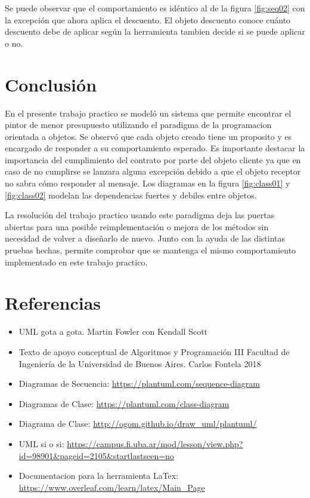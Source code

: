 \documentclass[titlepage,a4paper]{article}
\begin{document}
  Se puede observar que el comportamiento es idéntico al de la figura \ref{fig:seq02} 
  con la excepción que ahora aplica el descuento. El objeto descuento conoce cuánto descuento debe de aplicar según la herramienta 
  tambien decide si se puede aplicar o no.


  \section{Conclusión}
  
  En el presente trabajo practico se modeló un sistema que permite encontrar el pintor de menor presupuesto utilizando el paradigma de la programacion orientada a objetos. 
  Se observó que cada objeto creado tiene un proposito y es encargado de responder a su comportamiento esperado. Es importante destacar la 
  importancia del cumplimiento del contrato por parte del objeto cliente ya que en caso de no cumplirse se lanzara alguna excepción 
  debido a que el objeto receptor no sabra cómo responder al mensaje. Los diagramas en la figura \ref{fig:class01} y \ref{fig:class02} modelan las dependencias 
  fuertes y debiles entre objetos. \newline

  La resolución del trabajo practico usando este paradigma deja las puertas abiertas para una posible reimplementación o mejora de los métodos sin 
  necesidad de volver a diseñarlo de nuevo. Junto con la ayuda de las distintas pruebas hechas, permite comprobar que se mantenga el mismo 
  comportamiento implementado en este trabajo practico.

\newpage
\section{Referencias}

\begin{itemize}
  \item UML gota a gota. Martin Fowler con Kendall Scott
  \item Texto de apoyo conceptual de Algoritmos y Programación III Facultad de Ingeniería de la Universidad de Buenos Aires. Carlos Fontela 2018
  \item Diagramas de Secuencia: \url{https://plantuml.com/sequence-diagram}
  \item Diagramas de Clase: \url{https://plantuml.com/class-diagram}
  \item Diagrama de Clase: \url{http://ogom.github.io/draw_uml/plantuml/}
  \item UML si o si: \url{https://campus.fi.uba.ar/mod/lesson/view.php?id=98901&pageid=2105&startlastseen=no}
  \item Documentacion para la herramienta LaTex: \url{https://www.overleaf.com/learn/latex/Main_Page}
\end{itemize}
\end{document}
